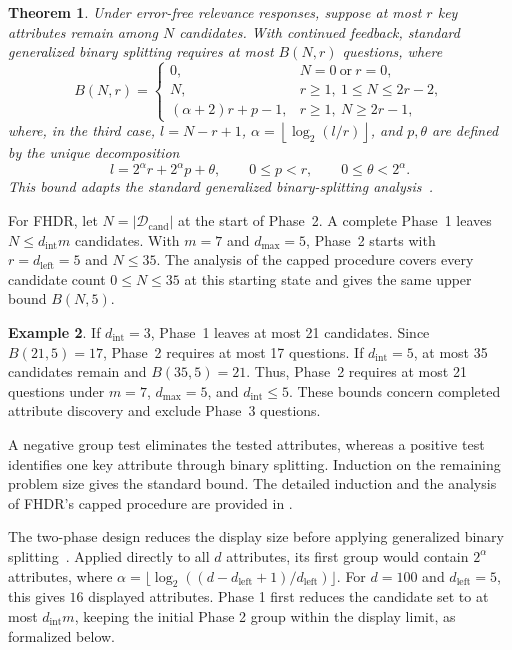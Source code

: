 \documentclass[conference]{IEEEtran}
\newtheorem{theorem}{Theorem}[section]
\theoremstyle{definition}
\newtheorem{example}[theorem]{Example}
\theoremstyle{plain}
\newcommand{\technicalreport}{\iftoggle{LinkTechnicalReport}{\href{https://github.com/JunyuLiao/High-dimensional-Regret-Minimization/blob/main/docs/TechnicalReport.pdf}{technical report}}{technical report}}
\begin{document}
\begin{theorem}\label{theorem_q}
    Under error-free relevance responses, suppose at most $r$ key attributes remain among $N$ candidates. With continued feedback, standard generalized binary splitting requires at most $B(N,r)$ questions, where
    \[
    B(N,r)=\left\{\begin{array}{ll}
    0, & N=0\ \text{or}\ r=0,\\[2pt]
    N, & r\geq1,\ 1\leq N\leq 2r-2,\\[2pt]
    (\alpha+2)r+p-1, & r\geq1,\ N\geq 2r-1,
    \end{array}\right.
    \]
    where, in the third case, $l=N-r+1$, $\alpha=\left\lfloor\log_2(l/r)\right\rfloor$, and $p,\theta$ are defined by the unique decomposition
    \[
    l=2^\alpha r+2^\alpha p+\theta,\qquad 0\leq p<r,\qquad 0\leq\theta<2^\alpha.
    \]
    This bound adapts the standard generalized binary-splitting analysis~\cite{hwang1972method,Du1993CombinatorialGT}.
\end{theorem}

For FHDR, let $N=|\mathcal{D}_\text{cand}|$ at the start of Phase~2. A complete Phase~1 leaves $N\leq d_\text{int}m$ candidates. With $m=7$ and $d_\text{max}=5$, Phase~2 starts with $r=d_\text{left}=5$ and $N\leq35$. The analysis of the capped procedure covers every candidate count $0\leq N\leq35$ at this starting state and gives the same upper bound $B(N,5)$.

\begin{example}
If $d_\text{int}=3$, Phase~1 leaves at most 21 candidates. Since $B(21,5)=17$, Phase~2 requires at most 17 questions. If $d_\text{int}=5$, at most 35 candidates remain and $B(35,5)=21$. Thus, Phase~2 requires at most 21 questions under $m=7$, $d_\text{max}=5$, and $d_\text{int}\leq5$. These bounds concern completed attribute discovery and exclude Phase~3 questions.
\end{example}

A negative group test eliminates the tested attributes, whereas a positive test identifies one key attribute through binary splitting. Induction on the remaining problem size gives the standard bound. The detailed induction and the analysis of FHDR's capped procedure are provided in \iftoggle{TechnicalReport}{Section~\ref{appen:proof} of the \technicalreport}{Appendix~\ref{appen:proof}}.

The two-phase design reduces the display size before applying generalized binary splitting~\cite{WGT}. Applied directly to all $d$ attributes, its first group would contain $2^\alpha$ attributes, where $\alpha=\lfloor\log_2((d-d_\text{left}+1)/d_\text{left})\rfloor$. For $d=100$ and $d_\text{left}=5$, this gives $16$ displayed attributes. Phase 1 first reduces the candidate set to at most $d_\text{int}m$, keeping the initial Phase 2 group within the display limit, as formalized below.
\end{document}
